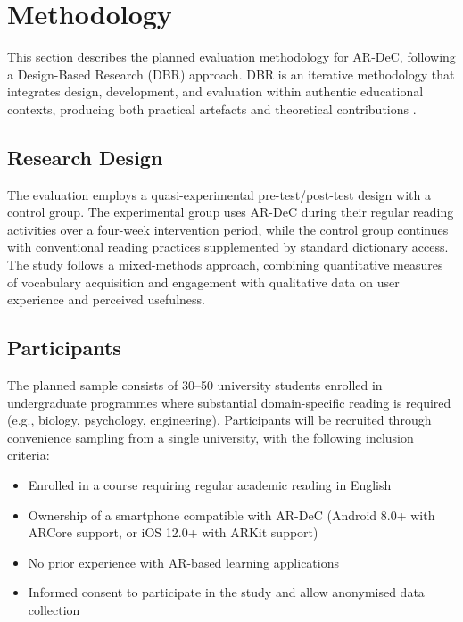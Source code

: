 
\section{Methodology}
\label{sec:methodology}

This section describes the planned evaluation methodology for AR-DeC, following a Design-Based Research (DBR) approach. DBR is an iterative methodology that integrates design, development, and evaluation within authentic educational contexts, producing both practical artefacts and theoretical contributions \cite{dede2009}.

\subsection{Research Design}
\label{subsec:research_design}

The evaluation employs a quasi-experimental pre-test/post-test design with a control group. The experimental group uses AR-DeC during their regular reading activities over a four-week intervention period, while the control group continues with conventional reading practices supplemented by standard dictionary access. The study follows a mixed-methods approach, combining quantitative measures of vocabulary acquisition and engagement with qualitative data on user experience and perceived usefulness.

\subsection{Participants}
\label{subsec:participants}

The planned sample consists of 30--50 university students enrolled in undergraduate programmes where substantial domain-specific reading is required (e.g., biology, psychology, engineering). Participants will be recruited through convenience sampling from a single university, with the following inclusion criteria:
\begin{itemize}
    \item Enrolled in a course requiring regular academic reading in English
    \item Ownership of a smartphone compatible with AR-DeC (Android 8.0+ with ARCore support, or iOS 12.0+ with ARKit support)
    \item No prior experience with AR-based learning applications
    \item Informed consent to participate in the study and allow anonymised data collection
\end{itemize}

